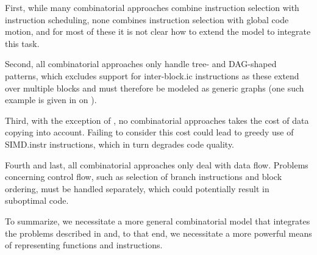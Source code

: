 First, while many combinatorial approaches combine \gls{instruction
  selection} with \gls{instruction scheduling}, none combines \gls{instruction
  selection} with \gls{global code motion}, and for most of these it is not
clear how to extend the model to integrate this task.

Second, all combinatorial approaches only handle tree- and \gls{DAG}-shaped
\glspl{pattern}, which excludes support for \gls{inter-block.ic}
\glspl{instruction} as these extend over multiple \glspl{block} and must
therefore be modeled as generic \glspl{graph} (one such example is given in
 on ).

Third, with the exception of \textcite{TanakaEtAl:2003}, no combinatorial
approaches takes the cost of \gls{data copying} into account.
%
Failing to consider this cost could lead to greedy use of \gls{SIMD.instr}
\glspl{instruction}, which in turn degrades code quality.

Fourth and last, all combinatorial approaches only deal with data flow.
%
Problems concerning control flow, such as selection of branch
\glspl{instruction} and \gls{block ordering}, must be handled separately, which
could potentially result in suboptimal code.

To summarize, we necessitate a more general combinatorial model that integrates
the problems described in  and, to that end, we
necessitate a more powerful means of representing \glspl{function} and
\glspl{instruction}.
